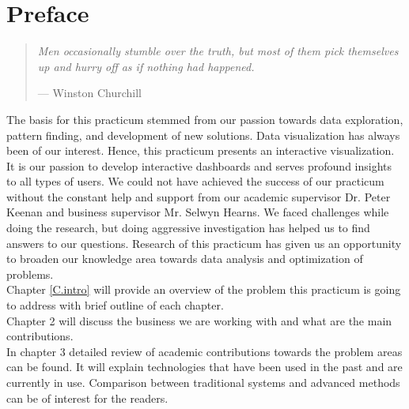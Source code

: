 %
%
%
%

\chapter*{Preface}


\begin{quote}
\noindent\textit{Men occasionally stumble over the truth, but most of them pick themselves up and
hurry off as if nothing had happened.}

\hspace{2cm}--- Winston Churchill
\end{quote}

The basis for this practicum stemmed from our passion towards data exploration, pattern finding, and development of new solutions. Data visualization has always been of our interest. Hence, this practicum presents an interactive visualization. It is our passion to develop interactive dashboards and serves profound insights to all types of users. We could not have achieved the success of our practicum without the constant help and support from our academic supervisor Dr. Peter Keenan and business supervisor Mr. Selwyn Hearns. We faced challenges while doing the research, but doing aggressive investigation has helped us to find answers to our questions. Research of this practicum has given us an opportunity to broaden our knowledge area towards data analysis and optimization of problems.\\

Chapter \ref{C.intro} will provide an overview of the problem this practicum is going to address with brief outline of each chapter.\\

Chapter 2 will discuss the business we are working with and what are the main contributions.\\

In chapter 3 detailed review of academic contributions towards the problem areas can be found. It will explain technologies that have been used in the past and are currently in use. Comparison between traditional systems and advanced methods can be of interest for the readers.\\

